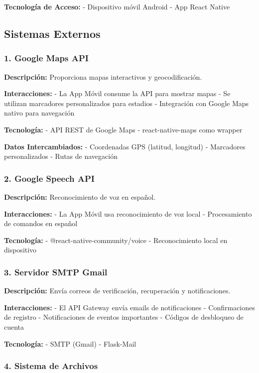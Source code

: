 \documentclass[
  spanish,
  11pt,
  letterpaper,
]{book}
\begin{document}
\textbf{Tecnología de Acceso:} - Dispositivo móvil Android - App React
Native

\subsection{Sistemas Externos}\label{sistemas-externos}

\subsubsection{1. Google Maps API}\label{google-maps-api}

\textbf{Descripción:} Proporciona mapas interactivos y geocodificación.

\textbf{Interacciones:} - La App Móvil consume la API para mostrar mapas
- Se utilizan marcadores personalizados para estadios - Integración con
Google Maps nativo para navegación

\textbf{Tecnología:} - API REST de Google Maps - react-native-maps como
wrapper

\textbf{Datos Intercambiados:} - Coordenadas GPS (latitud, longitud) -
Marcadores personalizados - Rutas de navegación

\subsubsection{2. Google Speech API}\label{google-speech-api}

\textbf{Descripción:} Reconocimiento de voz en español.

\textbf{Interacciones:} - La App Móvil usa reconocimiento de voz local -
Procesamiento de comandos en español

\textbf{Tecnología:} - @react-native-community/voice - Reconocimiento
local en dispositivo

\subsubsection{3. Servidor SMTP Gmail}\label{servidor-smtp-gmail}

\textbf{Descripción:} Envía correos de verificación, recuperación y
notificaciones.

\textbf{Interacciones:} - El API Gateway envía emails de notificaciones
- Confirmaciones de registro - Notificaciones de eventos importantes -
Códigos de desbloqueo de cuenta

\textbf{Tecnología:} - SMTP (Gmail) - Flask-Mail

\subsubsection{4. Sistema de Archivos}\label{sistema-de-archivos}
\end{document}
